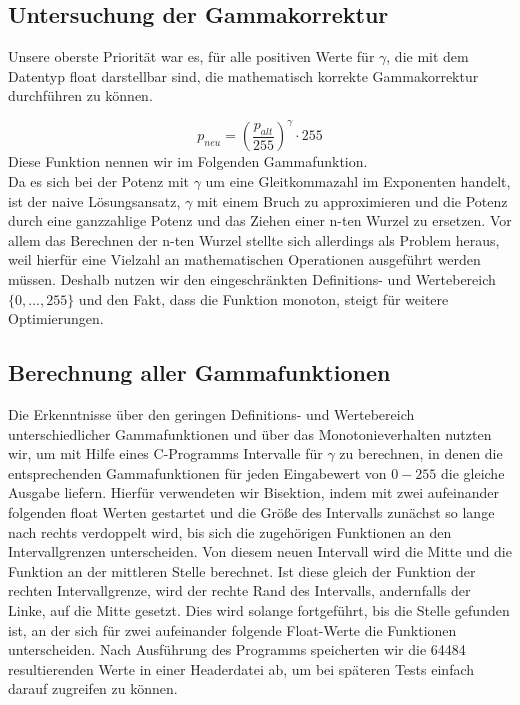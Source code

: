 \documentclass[course=erap]{aspdoc}
\begin{document}
	
	\subsection{Untersuchung der Gammakorrektur}
	Unsere oberste Priorität war es, für alle positiven Werte für $\gamma$, die mit dem Datentyp float darstellbar sind, die mathematisch korrekte Gammakorrektur durchführen zu können.
	
	\begin{equation}
	\label{(3)}
	p_{neu} = \left(\frac{p_{alt}}{255}\right)^{\gamma} \cdot 255
	\end{equation}   
	Diese Funktion nennen wir im Folgenden Gammafunktion.\\
	
	\noindent Da es sich bei der Potenz mit $\gamma$ um eine Gleitkommazahl im Exponenten handelt, ist der naive Lösungsansatz, $\gamma$ mit einem Bruch zu approximieren und die Potenz durch eine ganzzahlige Potenz und das Ziehen einer n-ten Wurzel zu ersetzen.
	Vor allem das Berechnen der n-ten Wurzel stellte sich allerdings als Problem heraus, weil hierfür eine Vielzahl an mathematischen Operationen ausgeführt werden müssen. Deshalb nutzen wir den eingeschränkten Definitions- und Wertebereich $\{0,...,255\}$ und den Fakt, dass die Funktion monoton, steigt für weitere Optimierungen.
	
	\subsection{Berechnung aller Gammafunktionen}
	Die Erkenntnisse über den geringen Definitions- und Wertebereich unterschiedlicher Gammafunktionen und über das Monotonieverhalten nutzten wir, um mit Hilfe eines C-Programms Intervalle für $\gamma$ zu berechnen, in denen die entsprechenden Gammafunktionen für jeden Eingabewert von $0-255$ die gleiche Ausgabe liefern. Hierfür verwendeten wir Bisektion, indem mit zwei aufeinander folgenden float Werten gestartet und die Größe des Intervalls zunächst so lange nach rechts verdoppelt wird, bis sich die zugehörigen Funktionen an den Intervallgrenzen unterscheiden. Von diesem neuen Intervall wird die Mitte und die Funktion an der mittleren Stelle berechnet. Ist diese gleich der Funktion der rechten Intervallgrenze, wird der rechte Rand des Intervalls, andernfalls der Linke, auf die Mitte gesetzt. Dies wird solange fortgeführt, bis die Stelle gefunden ist, an der sich für zwei aufeinander folgende Float-Werte die Funktionen unterscheiden. Nach Ausführung des Programms speicherten wir die 64484 resultierenden Werte in einer Headerdatei ab, um bei späteren Tests einfach darauf zugreifen zu können.
	
\end{document}
